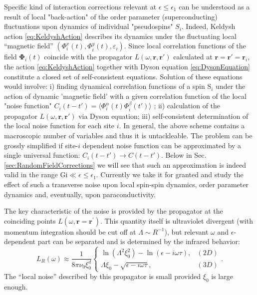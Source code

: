 \documentclass[twocolumn,english,prb]{revtex4-1}
\begin{document}
Specific kind of interaction corrections relevant at $\epsilon \leq \epsilon_1$ can be understood as a result
of local "back-action" of the order parameter (superconducting) fluctuations upon dynamics of 
individual "pseudospins"  $S_i$. Indeed, Keldysh action \eqref{eq:KeldyshAction} describes its dynamics under the fluctuating
local  ``magnetic field'' $(\Phi^x_i(t), \Phi^y_i(t), \varepsilon_i)$. Since local correlation functions of the field
$\boldsymbol{\Phi}_i(t)$  coincide with the  propagator $L(\omega, \boldsymbol{r},\boldsymbol{r}') $ calculated at
$\boldsymbol{r} = \boldsymbol{r}' = \boldsymbol{r}_i$, the action \eqref{eq:KeldyshAction} together with 
Dyson equation \eqref{eq:DysonEquation} constitute a closed set of self-consistent equations. Solution of these
equations would involve: i)  finding dynamical correlation functions of a spin $\mathrm{S}_i$ under the action of dynamic
'magnetic field' with a given correlation function of the local "noise function" 
$C_i(t-t') = \langle \Phi^\alpha_i(t)\Phi^\beta_i(t')\rangle$ ; 
ii) calculation of the propagator $L(\omega, \boldsymbol{r},\boldsymbol{r}') $ via Dyson equation; iii) self-consistent
determination of the local noise function for each site $i$. 
In general, the above scheme contains a macroscopic number of variables and thus it is untackleable.  
The problem can be grossly simplified if  site-$i$ dependent  noise function can be approximated
by a single universal function: $C_i(t-t') \to C(t-t')$.  Below in Sec.\ref{sec:RandomFieldCorrections} we will see that such an approximation is
indeed valid in the range $\mathrm{Gi} \ll \epsilon \leq \epsilon_1$. 
Currently we take it for granted and study the effect of such a transverse noise upon local spin-spin dynamics,
order parameter dynamics and, eventually, upon paraconductivity.

The key characteristic of the noise is provided by the propagator at the  coinciding points $L(\omega, \boldsymbol{r}=\boldsymbol{r}^\prime)$. This quantity itself is ultraviolet divergent (with momentum integration should be cut off at $\Lambda \sim R^{-1}$), but relevant $\omega$ and $\epsilon$-dependent part can be separated and is determined by the infrared behavior:
\begin{equation}
\label{eq:OrderParameterLocalPropagator}
L_{R}(\omega)\approx\frac{1}{8\pi\nu_{0}\xi_{0}^{d}}\begin{cases}
\ln(\Lambda^{2}\xi_{0}^{2})-\ln(\epsilon-i\omega\tau), & (2D)\\
\Lambda\xi_{0}-\sqrt{\epsilon-i\omega\tau}, & (3D)
\end{cases}.
\end{equation}
The ``local noise'' described by this propagator is small provided $\xi_0$ is large enough.
\end{document}
